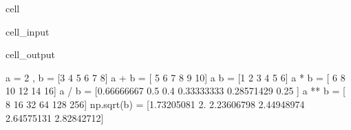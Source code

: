\documentclass[letterpaper,10pt,english]{jupyterBook}
\begin{document}
\begin{sphinxuseclass}{cell}\begin{sphinxVerbatimInput}

\begin{sphinxuseclass}{cell_input}
\begin{sphinxVerbatim}[commandchars=\\\{\}]
  
  \PYG{p}{[}     \PYG{p}{]}
  
   
   
   
   
   
   
   
\end{sphinxVerbatim}

\end{sphinxuseclass}\end{sphinxVerbatimInput}
\begin{sphinxVerbatimOutput}

\begin{sphinxuseclass}{cell_output}
\begin{sphinxVerbatim}[commandchars=\\\{\}]
a = 2 , b = [3 4 5 6 7 8]
a + b = [ 5  6  7  8  9 10]
a \PYGZhy{} b = [\PYGZhy{}1 \PYGZhy{}2 \PYGZhy{}3 \PYGZhy{}4 \PYGZhy{}5 \PYGZhy{}6]
a * b = [ 6  8 10 12 14 16]
a / b = [0.66666667 0.5        0.4        0.33333333 0.28571429 0.25      ]
a ** b = [  8  16  32  64 128 256]
np.sqrt(b) = [1.73205081 2.         2.23606798 2.44948974 2.64575131 2.82842712]
\end{sphinxVerbatim}

\end{sphinxuseclass}\end{sphinxVerbatimOutput}

\end{sphinxuseclass}
\end{document}
